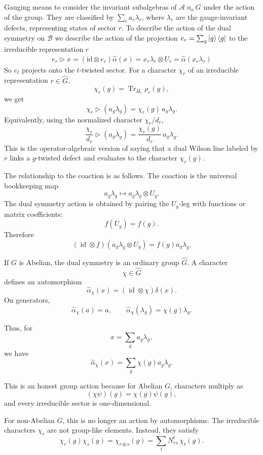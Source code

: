 \documentclass[11pt]{article}
\newcommand{\mA}{\mathcal{A}}
\begin{document}
Gauging means to consider the invariant subalgebras of $\mA\rtimes_\alpha G$ under the action of the group. They are classified by $\sum_r a_r \lambda_r$, where $\lambda_r$ are the gauge-invariant defects, representing states of sector $r$. To describe the action of the dual symmetry on $\mathcal{B}$ we describe the action of the projection $e_r=\sum_g \ket{g}\bra{g}$ to the irreducible representation $r$
\begin{align}
    e_r\triangleright x=(\text{id}\otimes e_r)\hat{\alpha}(x)=x_r \lambda_r\otimes U_r=\hat{\alpha}(x_r\lambda_r)
\end{align}
So \(e_t\) projects onto the \(t\)-twisted sector. For a character \(\chi_r\) of an irreducible representation \(r\in\widehat G\),
\[
\chi_r(g)=\operatorname{Tr}_{H_r}\rho_r(g),
\]
we get
\[
\chi_r\triangleright (a_g\lambda_g)
=
\chi_r(g)\,a_g\lambda_g.
\]
Equivalently, using the normalized character \(\chi_r/d_r\),
\[
\frac{\chi_r}{d_r}\triangleright(a_g\lambda_g)
=
\frac{\chi_r(g)}{d_r}\,a_g\lambda_g.
\]
This is the operator-algebraic version of saying that a dual Wilson line labeled by \(r\) links a \(g\)-twisted defect and evaluates to the character \(\chi_r(g)\).

The relationship to the coaction is as follows. The coaction is the universal bookkeeping map
\[
a_g\lambda_g
\longmapsto
a_g\lambda_g\otimes U_g.
\]
The dual symmetry action is obtained by pairing the \(U_g\)-leg with functions or matrix coefficients:
\[
f(U_g)=f(g).
\]
Therefore
\[
(\operatorname{id}\otimes f)(a_g\lambda_g\otimes U_g)
=
f(g)a_g\lambda_g.
\]

If \(G\) is Abelian, the dual symmetry is an ordinary group \(\widehat G\). A character
\[
\chi\in\widehat G
\]
defines an automorphism
\[
\widehat\alpha_\chi(x)
=
(\operatorname{id}\otimes \chi)\delta(x).
\]
On generators,
\[
\widehat\alpha_\chi(a)=a,
\qquad
\widehat\alpha_\chi(\lambda_g)=\chi(g)\lambda_g.
\]

Thus, for
\[
x=\sum_g a_g\lambda_g,
\]
we have
\[
\widehat\alpha_\chi(x)
=
\sum_g \chi(g)a_g\lambda_g.
\]

This is an honest group action because for Abelian \(G\), characters multiply as
\[
(\chi\psi)(g)=\chi(g)\psi(g),
\]
and every irreducible sector is one-dimensional.

For non-Abelian \(G\), this is no longer an action by automorphisms. The irreducible characters \(\chi_r\) are not group-like elements. Instead, they satisfy
\[
\chi_r(g)\chi_s(g)
=
\chi_{r\otimes s}(g)
=
\sum_t N_{rs}^t\,\chi_t(g).
\]
\end{document}
